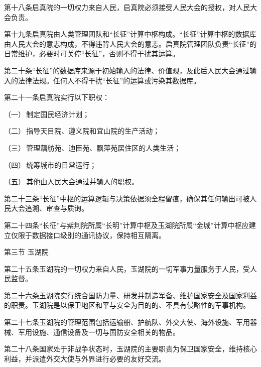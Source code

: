 {\vspace{0.6\baselineskip}

\noindent 第十八条\quad 启真院的一切权力来自人民，启真院必须接受人民大会的授权，对人民大会负责。

\noindent 第十九条\quad 启真院由人类管理团队和“长征”计算中枢构成。“长征”计算中枢的数据库由人民大会的意志构成，不得违背人民大会的意志。启真院管理团队负责“长征”的日常维护，必要时可关停“长征”，否则不得干扰其运算。

\noindent 第二十条\quad “长征”的数据库来源于初始输入的法律、价值观，及此后人民大会通过输入的法律法规。任何人不得干扰“长征”的运算或污染其数据库。

\noindent 第二十一条\quad 启真院实行以下职权：

\hspace*{2em}（一）\,制定国民经济计划；

\hspace*{2em}（二）\,指导天目院、遵义院和宜山院的生产活动；

\hspace*{2em}（三）\,管理藕舫苑、迪臣苑、飘萍苑居住区的人类生活；

\hspace*{2em}（四）\,统筹城市的日常运行；

\hspace*{2em}（五）\,其他由人民大会通过并输入的职权。

\noindent 第二十三条\quad “长征”中枢的运算逻辑与决策依据须全程留痕，确保其任何输出可被人民大会追溯、审查与质询。

\noindent 第二十四条\quad “长征”与紫荆院所属“长明”计算中枢及玉湖院所属“金城”计算中枢应建立仅限于数据接口级别的通讯协议，保持相互隔离。

\vspace{0.6\baselineskip}

第三节\,\,玉湖院

\vspace{0.6\baselineskip}

\noindent 第二十五条\quad 玉湖院的一切权力来自人民，玉湖院的一切军事力量服务于人民，受人民监督。

\noindent 第二十六条\quad 玉湖院实行统合国防力量、研发并制造军备、维护国家安全及国家利益的职责。玉湖院是以保卫地区和平与安全为目的的、不具有侵略性的军事机构。

\noindent 第二十七条\quad 玉湖院的管理范围包括运输船、护航队、外交大使、海外设施、军用器械、军用设施、通信设备及一切与国防安全相关的物品。

\noindent 第二十八条\quad 国家处于非战争状态时，玉湖院的主要职责为保卫国家安全，维持核心利益，并派遣外交大使与外界进行必要的友好交流。

}
